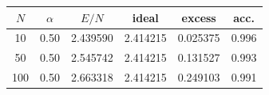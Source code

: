 \begin{center}
\label{tab:1g-minima}
\setlength{\tabcolsep}{2.2pt}
\begin{tabular}{@{}cccccc@{}}
\toprule
$N$ & $\alpha$ & $E/N$ & ideal & excess & acc. \\
\midrule
10 & 0.50 & 2.439590 & 2.414215 & 0.025375 & 0.996 \\
50 & 0.50 & 2.545742 & 2.414215 & 0.131527 & 0.993 \\
100 & 0.50 & 2.663318 & 2.414215 & 0.249103 & 0.991 \\
\bottomrule
\end{tabular}
\end{center}
